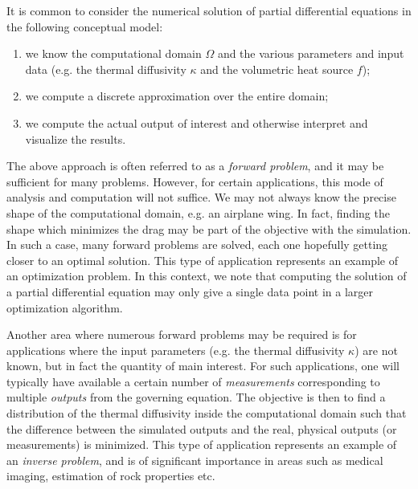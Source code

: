 It is common to consider the numerical solution of partial differential
equations in the following conceptual model:
\begin{enumerate}
\item we know the computational domain $\Omega$ and the various parameters and
  input data (e.g. the thermal diffusivity $\kappa$ and the volumetric heat
  source $f$);
\item we compute a discrete approximation over the entire domain;
\item we compute the actual output of interest and otherwise interpret and
  visualize the results.
\end{enumerate}

The above approach is often referred to as a \emph{forward problem}, and it may
be sufficient for many problems. However, for certain applications, this mode of
analysis and computation will not suffice. We may not always know the precise
shape of the computational domain, e.g. an airplane wing. In fact, finding the
shape which minimizes the drag may be part of the objective with the simulation.
In such a case, many forward problems are solved, each one hopefully getting
closer to an optimal solution. This type of application represents an example of
an optimization problem. In this context, we note that computing the solution of
a partial differential equation may only give a single data point in a larger
optimization algorithm.

Another area where numerous forward problems may be required is for applications
where the input parameters (e.g. the thermal diffusivity $\kappa$) are not
known, but in fact the quantity of main interest. For such applications, one
will typically have available a certain number of \emph{measurements}
corresponding to multiple \emph{outputs} from the governing equation. The
objective is then to find a distribution of the thermal diffusivity inside the
computational domain such that the difference between the simulated outputs and
the real, physical outputs (or measurements) is minimized. This type of
application represents an example of an \emph{inverse problem}, and is of
significant importance in areas such as medical imaging, estimation of rock
properties etc.
